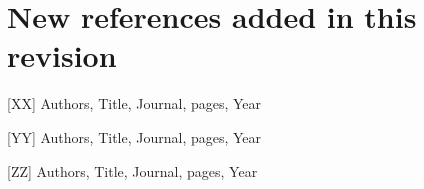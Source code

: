 \documentclass[preprint]{elsarticle}
\begin{document}
\section{New references added in this revision}

[XX] Authors, Title, Journal, pages, Year

[YY] Authors, Title, Journal, pages, Year

[ZZ] Authors, Title, Journal, pages, Year
\end{document}
